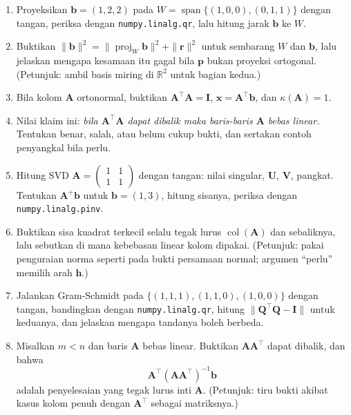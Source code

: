 \begin{latihan}
\begin{enumerate}
  \item Proyeksikan $\mathbf{b}=(1,2,2)$ pada $W=\operatorname{span}\{(1,0,0),(0,1,1)\}$
        dengan tangan, periksa dengan \texttt{numpy.linalg.qr}, lalu hitung jarak
        $\mathbf{b}$ ke $W$.

  \item Buktikan $\|\mathbf{b}\|^{2}=\|\operatorname{proj}_{W}\mathbf{b}\|^{2}
        +\|\mathbf{r}\|^{2}$ untuk sembarang $W$ dan $\mathbf{b}$, lalu jelaskan mengapa
        kesamaan itu gagal bila $\mathbf{p}$ bukan proyeksi ortogonal. (Petunjuk: ambil
        basis miring di $\mathbb{R}^{2}$ untuk bagian kedua.)

  \item Bila kolom $\mathbf{A}$ ortonormal, buktikan $\mathbf{A}^{\top}\mathbf{A}=\mathbf{I}$,
        $\hat{\mathbf{x}}=\mathbf{A}^{\top}\mathbf{b}$, dan $\kappa(\mathbf{A})=1$.

  \item Nilai klaim ini: \emph{bila $\mathbf{A}^{\top}\mathbf{A}$ dapat dibalik maka
        baris-baris $\mathbf{A}$ bebas linear.} Tentukan benar, salah, atau belum cukup
        bukti, dan sertakan contoh penyangkal bila perlu.

  \item Hitung SVD $\mathbf{A}=\begin{pmatrix}1&1\\ 1&1\end{pmatrix}$ dengan tangan: nilai
        singular, $\mathbf{U}$, $\mathbf{V}$, pangkat. Tentukan $\mathbf{A}^{+}\mathbf{b}$
        untuk $\mathbf{b}=(1,3)$, hitung sisanya, periksa dengan
        \texttt{numpy.linalg.pinv}.

  \item Buktikan sisa kuadrat terkecil selalu tegak lurus $\operatorname{col}(\mathbf{A})$
        dan sebaliknya, lalu sebutkan di mana kebebasan linear kolom dipakai.
        (Petunjuk: pakai penguraian norma seperti pada bukti persamaan normal; argumen
        ``perlu'' memilih arah $\mathbf{h}$.)

  \item Jalankan Gram-Schmidt pada $\{(1,1,1),(1,1,0),(1,0,0)\}$ dengan tangan, bandingkan
        dengan \texttt{numpy.linalg.qr}, hitung $\|\mathbf{Q}^{\top}\mathbf{Q}-\mathbf{I}\|$
        untuk keduanya, dan jelaskan mengapa tandanya boleh berbeda.

  \item Misalkan $m<n$ dan baris $\mathbf{A}$ bebas linear. Buktikan
        $\mathbf{A}\mathbf{A}^{\top}$ dapat dibalik, dan bahwa
        \[ \mathbf{A}^{\top}(\mathbf{A}\mathbf{A}^{\top})^{-1}\mathbf{b} \]
        adalah penyelesaian yang tegak lurus inti $\mathbf{A}$. (Petunjuk: tiru bukti
        akibat kasus kolom penuh dengan $\mathbf{A}^{\top}$ sebagai matriksnya.)


\end{enumerate}
\end{latihan}
